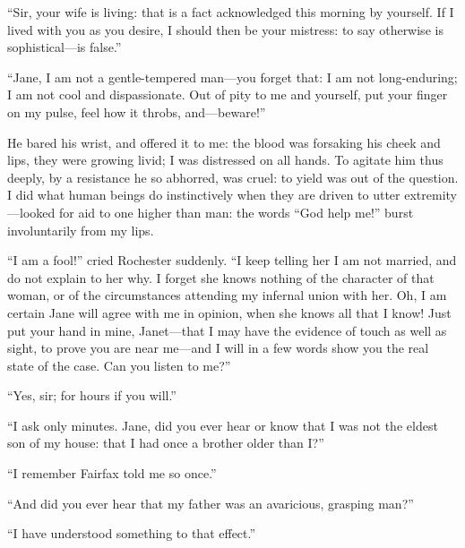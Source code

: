 \enquote{Sir, your wife is living: that is a fact acknowledged this
	morning by yourself. If I lived with you as you desire, I should then
	be your mistress: to say otherwise is sophistical---is false.}

\enquote{Jane, I am not a gentle-tempered man---you forget that: I am
	not long-enduring; I am not cool and dispassionate. Out of pity to me
	and yourself, put your finger on my pulse, feel how it throbs,
	and---beware!}

He bared his wrist, and offered it to me: the blood was forsaking his
cheek and lips, they were growing livid; I was distressed on all hands.
To agitate him thus deeply, by a resistance he so abhorred, was cruel:
to yield was out of the question. I did what human beings do
instinctively when they are driven to utter extremity---looked for aid
to one higher than man: the words \enquote{God help me!} burst
involuntarily from my lips.

\enquote{I am a fool!} cried \Mr{} Rochester suddenly. \enquote{I keep
	telling her I am not married, and do not explain to her why. I forget
	she knows nothing of the character of that woman, or of the
	circumstances attending my infernal union with her. Oh, I am certain
	Jane will agree with me in opinion, when she knows all that I know!
	Just put your hand in mine, Janet---that I may have the evidence of
	touch as well as sight, to prove you are near me---and I will in a few
	words show you the real state of the case. Can you listen to me?}

\enquote{Yes, sir; for hours if you will.}

\enquote{I ask only minutes. Jane, did you ever hear or know that I was
	not the eldest son of my house: that I had once a brother older than I?}

\enquote{I remember \Mrs{} Fairfax told me so once.}

\enquote{And did you ever hear that my father was an avaricious,
	grasping man?}

\enquote{I have understood something to that effect.}

